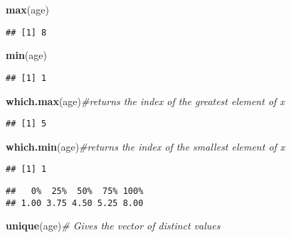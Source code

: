 \documentclass[]{book}
\newenvironment{Shaded}{\begin{snugshade}}{\end{snugshade}}
\newcommand{\KeywordTok}[1]{\textcolor[rgb]{0.13,0.29,0.53}{\textbf{#1}}}
\newcommand{\CommentTok}[1]{\textcolor[rgb]{0.56,0.35,0.01}{\textit{#1}}}
\newcommand{\NormalTok}[1]{#1}
\theoremstyle{definition}
\theoremstyle{definition}
\theoremstyle{definition}
\theoremstyle{remark}
\begin{document}
\begin{Shaded}
\begin{Highlighting}[]
\KeywordTok{max}\NormalTok{(age)}
\end{Highlighting}
\end{Shaded}

\begin{verbatim}
## [1] 8
\end{verbatim}

\begin{Shaded}
\begin{Highlighting}[]
\KeywordTok{min}\NormalTok{(age)}
\end{Highlighting}
\end{Shaded}

\begin{verbatim}
## [1] 1
\end{verbatim}

\begin{Shaded}
\begin{Highlighting}[]
\KeywordTok{which.max}\NormalTok{(age)}\CommentTok{#returns the index of the greatest element of x}
\end{Highlighting}
\end{Shaded}

\begin{verbatim}
## [1] 5
\end{verbatim}

\begin{Shaded}
\begin{Highlighting}[]
\KeywordTok{which.min}\NormalTok{(age)}\CommentTok{#returns the index of the smallest element of x}
\end{Highlighting}
\end{Shaded}

\begin{verbatim}
## [1] 1
\end{verbatim}

\begin{Shaded}
\end{Shaded}

\begin{verbatim}
##   0%  25%  50%  75% 100% 
## 1.00 3.75 4.50 5.25 8.00
\end{verbatim}

\begin{Shaded}
\begin{Highlighting}[]
\KeywordTok{unique}\NormalTok{(age)}\CommentTok{# Gives the vector of distinct values}
\end{Highlighting}
\end{Shaded}
\end{document}
